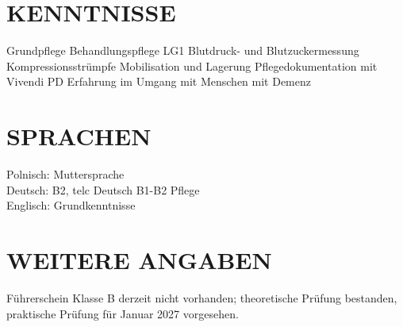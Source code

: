\documentclass[11pt,a4paper]{article}
\begin{document}
\section*{KENNTNISSE}
Grundpflege \textbar{} Behandlungspflege LG1 \textbar{} Blutdruck- und Blutzuckermessung \textbar{} Kompressionsstrümpfe \textbar{} Mobilisation und Lagerung \textbar{} Pflegedokumentation mit Vivendi PD \textbar{} Erfahrung im Umgang mit Menschen mit Demenz

\section*{SPRACHEN}
Polnisch: Muttersprache\\
Deutsch: B2, telc Deutsch B1-B2 Pflege\\
Englisch: Grundkenntnisse

\section*{WEITERE ANGABEN}
Führerschein Klasse B derzeit nicht vorhanden; theoretische Prüfung bestanden, praktische Prüfung für Januar 2027 vorgesehen.
\end{document}
